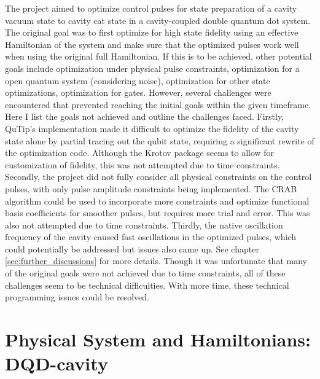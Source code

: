 \documentclass[12pt]{report}
\begin{document}
The project aimed to optimize control pulses for state preparation of a cavity vacuum state to cavity cat state in a cavity-coupled double quantum dot system.
The original goal was to first optimize for high state fidelity using an effective Hamiltonian of the system and make sure that the optimized pulses work well when using the original full Hamiltonian.
If this is to be achieved, other potential goals include optimization under physical pulse constraints, optimization for a open quantum system (considering noise), optimization for other state optimizations, optimization for gates.
However, several challenges were encountered that prevented reaching the initial goals within the given timeframe. Here I list the goals not achieved and outline the challenges faced.
Firstly, QuTip's implementation made it difficult to optimize the fidelity of the cavity state alone by partial tracing out the qubit state, requiring a significant rewrite of the optimization code. 
Although the Krotov package seems to allow for customization of fidelity, this was not attempted due to time constraints. 
Secondly, the project did not fully consider all physical constraints on the control pulses, with only pulse amplitude constraints being implemented. 
The CRAB algorithm could be used to incorporate more constraints and optimize functional basis coefficients for smoother pulses, but requires more trial and error. This was also not attempted due to time constraints.
Thirdly, the native oscillation frequency of the cavity caused fast oscillations in the optimized pulses, which could potentially be addressed but issues also came up. See chapter \ref{sec:further_discussions} for more details.
Though it was unfortunate that many of the original goals were not achieved due to time constraints, all of these challenges seem to be technical difficulties. 
With more time, these technical programming issues could be resolved.

\chapter{Physical System and Hamiltonians: DQD-cavity}\label{sec:physical_system}
\end{document}
